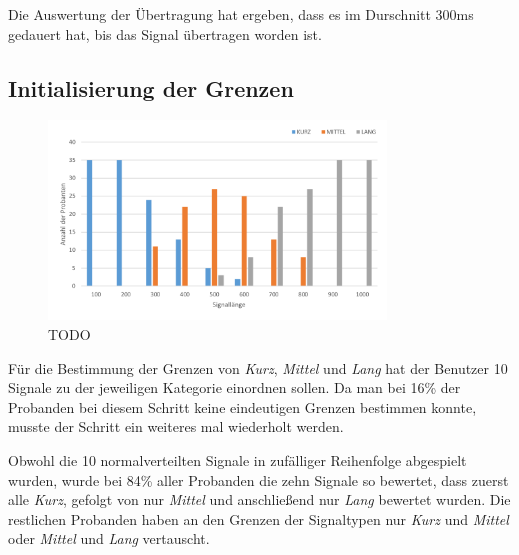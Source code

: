 Die Auswertung der {\"U}bertragung hat ergeben, dass es im Durschnitt 300ms gedauert hat, bis das Signal {\"u}bertragen worden ist.

\subsection{Initialisierung der Grenzen}
\label{ch:Evolution{\"a}rer Algorithmus:sec:Studiendesign}

\begin{figure}[htbp] 
            \centering
   	\includegraphics[width=0.8\textwidth]{pics/analyse/Initialisierung.png}
	\caption{TODO}
	\label{fig:Initialisierung}
\end{figure}

F{\"u}r die Bestimmung der Grenzen von \textit{Kurz}, \textit{Mittel} und \textit{Lang} hat der Benutzer 10 Signale zu der jeweiligen Kategorie einordnen sollen. 
Da man bei 16\% der Probanden bei diesem Schritt keine eindeutigen Grenzen bestimmen konnte, musste der Schritt ein weiteres mal wiederholt werden. 

Obwohl die 10 normalverteilten Signale in zuf{\"a}lliger Reihenfolge abgespielt wurden, wurde bei 84\% aller Probanden die zehn Signale so bewertet, dass zuerst alle \textit{Kurz}, gefolgt von nur \textit{Mittel} und anschlie{\ss}end nur \textit{Lang} bewertet wurden. 
Die restlichen Probanden haben an den Grenzen der Signaltypen nur \textit{Kurz} und \textit{Mittel} oder \textit{Mittel} und \textit{Lang} vertauscht.


